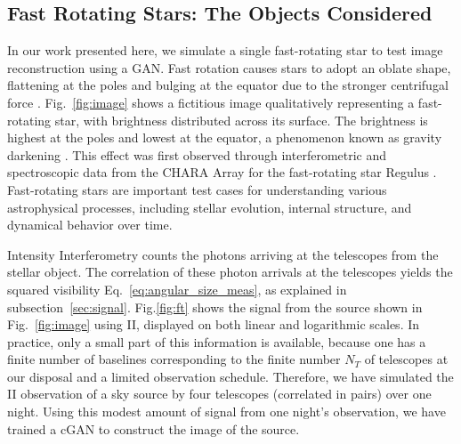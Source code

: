 \subsection{Fast Rotating Stars: The Objects Considered}
In our work presented here, we simulate a single fast-rotating star to test image reconstruction using a GAN. Fast rotation causes stars to adopt an oblate shape, flattening at the poles and bulging at the equator due to the stronger centrifugal force \citep[e.g.,][]{von1924radiative, 1999A&A...347..185M}. Fig.~\ref{fig:image} shows a fictitious image qualitatively representing a fast-rotating star, with brightness distributed across its surface. The brightness is highest at the poles and lowest at the equator, a phenomenon known as gravity darkening \citep{lucy1967gravity}. This effect was first observed through interferometric and spectroscopic data from the CHARA Array for the fast-rotating star Regulus \cite{mcalister2005first}. Fast-rotating stars are important test cases for understanding various astrophysical processes, including stellar evolution, internal structure, and dynamical behavior over time.

Intensity Interferometry counts the photons arriving at the telescopes from the stellar object. The correlation of these photon arrivals at the telescopes yields the squared visibility Eq.~\eqref{eq:angular_size_meas}, as explained in subsection~\ref{sec:signal}. Fig.\ref{fig:ft} shows the signal from the source shown in Fig.~\ref{fig:image} using II, displayed on both linear and logarithmic scales. In practice, only a small part of this information is available, because one has a finite number of baselines corresponding to the finite number $N_T$ of telescopes at our disposal and a limited observation schedule. Therefore, we have simulated the II observation of a sky source by four telescopes (correlated in pairs) over one night. Using this modest amount of signal from one night's observation, we have trained a cGAN to construct the image of the source.

